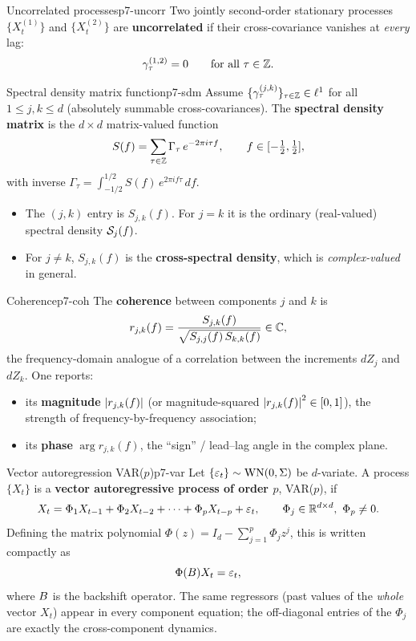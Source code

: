 \begin{definition}{Uncorrelated processes}{p7-uncorr}
Two jointly second-order stationary processes $\{X_t^{(1)}\}$ and
$\{X_t^{(2)}\}$ are \textbf{uncorrelated} if their cross-covariance vanishes at
\emph{every} lag:
\[
\gamma_\tau^{(1,2)}=0\qquad\text{for all }\tau\in\mathbb{Z} .
\]
\end{definition}

\begin{definition}{Spectral density matrix function}{p7-sdm}
Assume $\{\gamma_\tau^{(j,k)}\}_{\tau\in\mathbb{Z}}\in\ell^1$ for all $1\le j,k\le d$
(absolutely summable cross-covariances). The \textbf{spectral density matrix}
is the $d\times d$ matrix-valued function
\[
S(f)=\sum_{\tau\in\mathbb{Z}}\Gamma_\tau\,e^{-2\pi i\tau f},
\qquad f\in[-\tfrac12,\tfrac12],
\]
with inverse $\displaystyle \Gamma_\tau=\int_{-1/2}^{1/2}S(f)\,e^{2\pi if\tau}\,df$.
\begin{itemize}
  \item The $(j,k)$ entry is $S_{j,k}(f)$. For $j=k$ it is the ordinary
        (real-valued) spectral density $\mathcal{S}_{j}(f)$.
  \item For $j\ne k$, $S_{j,k}(f)$ is the \textbf{cross-spectral density}, which
        is \emph{complex-valued} in general.
\end{itemize}
\end{definition}

\begin{definition}{Coherence}{p7-coh}
The \textbf{coherence} between components $j$ and $k$ is
\[
r_{j,k}(f)=\frac{S_{j,k}(f)}{\sqrt{S_{j,j}(f)\,S_{k,k}(f)}}\in\mathbb{C} ,
\]
the frequency-domain analogue of a correlation between the increments $dZ_j$ and
$dZ_k$. One reports:
\begin{itemize}
  \item its \textbf{magnitude} $\left\lvert r_{j,k}(f) \right\rvert$ (or magnitude-squared
        $\left\lvert r_{j,k}(f) \right\rvert^2\in[0,1]$), the strength of frequency-by-frequency
        association;
  \item its \textbf{phase} $\arg r_{j,k}(f)$, the ``sign'' / lead--lag angle in
        the complex plane.
\end{itemize}
\end{definition}

\begin{definition}{Vector autoregression VAR($p$)}{p7-var}
Let $\{\varepsilon_t\}\sim\mathrm{WN}(0,\Sigma)$ be $d$-variate. A process $\{X_t\}$ is
a \textbf{vector autoregressive process of order $p$}, VAR($p$), if
\[
X_t=\Phi_1 X_{t-1}+\Phi_2 X_{t-2}+\cdots+\Phi_p X_{t-p}+\varepsilon_t ,
\qquad \Phi_j\in\mathbb{R}^{d\times d},\ \Phi_p\ne0 .
\]
Defining the matrix polynomial $\Phi(z)=I_d-\sum_{j=1}^p\Phi_j z^j$, this is
written compactly as
\[
\Phi(B)X_t=\varepsilon_t ,
\]
where $B$ is the backshift operator. The same regressors (past values of
the \emph{whole} vector $X_t$) appear in every component equation; the
off-diagonal entries of the $\Phi_j$ are exactly the cross-component dynamics.
\end{definition}

